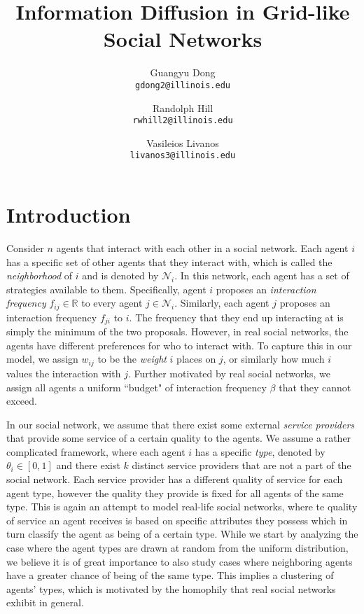 \documentclass[A4paper,11pt]{article}
\author{
	{\sc Guangyu Dong} \\
	\texttt{gdong2@illinois.edu}
	\and
	{\sc Randolph Hill} \\
	\texttt{rwhill2@illinois.edu}
	\and
	{\sc Vasileios Livanos} \\
	\texttt{livanos3@illinois.edu}
}
\title{
Information Diffusion in Grid-like Social Networks
}
\date{}
\begin{document}
 \maketitle

\section{Introduction}

\par Consider $n$ agents that interact with each other in a social network. Each agent $i$ has a specific set of other agents
that they interact with, which is called the \textit{neighborhood} of $i$ and is denoted by $\mathcal{N}_i$. In this network,
each agent has a set of strategies available to them. Specifically, agent $i$ proposes an \textit{interaction frequency}
$f_{ij} \in \mathbb{R}$ to every agent $j \in \mathcal{N}_i$. Similarly, each agent $j$ proposes an
interaction frequency $f_{ji}$ to $i$. The frequency that they end up interacting at is simply the minimum of the two
proposals. However, in real social networks, the agents have different preferences for who to interact with. To capture this
in our model, we assign $w_{ij}$ to be the \textit{weight} $i$ places on $j$, or similarly how much $i$ values the interaction
with $j$. Further motivated by real social networks, we assign all agents a uniform ``budget" of interaction frequency $\beta$
that they cannot exceed.

\par In our social network, we assume that there exist some external \textit{service providers} that provide some service of a
certain quality to the agents. We assume a rather complicated framework, where each agent $i$ has a specific \textit{type},
denoted by $\theta_i \in [0, 1]$ and there exist $k$ distinct service providers that are not a part of the social network. Each
service provider has a different quality of service for each agent type, however the quality they provide is fixed for all agents
of the same type. This is again an attempt to model real-life social networks, where te quality of service an agent receives
is based on specific attributes they possess which in turn classify the agent as being of a certain type. While we start by
analyzing the case where the agent types are drawn at random from the uniform distribution, we believe it is of great
importance to also study cases where neighboring agents have a greater chance of being of the same type. This implies a
clustering of agents' types, which is motivated by the homophily that real social networks exhibit in general.
\end{document}
